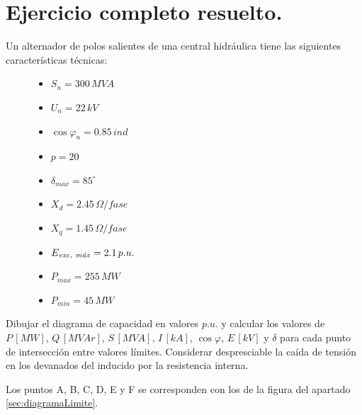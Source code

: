 		
	\section{Ejercicio completo resuelto.}		
		Un alternador de polos salientes de una central hidráulica tiene las siguientes características técnicas:
		\begin{figure}[H]
			\begin{minipage}{0.33\textwidth}
				\begin{itemize}
					\item $S_n = 300\,MV\!A$
					\item $U_n = 22\,kV$
					\item $\cos \varphi_n = 0.85\,ind$
					\item $p = 20$
				\end{itemize}
			\end{minipage}
			\begin{minipage}{0.33\textwidth}
				\begin{itemize}
					\item $\delta_{max} = 85^\circ$
					\item $X_d = 2.45\,\varOmega/fase$
					\item $X_q = 1.45\,\varOmega/fase$
				\end{itemize}
			\end{minipage}
			\begin{minipage}{0.33\textwidth}
				\begin{itemize}
					\item $E_{\text{\textit{exc, máx}}} = 2.1\,p.u.$
					\item $P_{max} = 255\,MW$
					\item $P_{min} = 45\,MW$
				\end{itemize}
			\end{minipage}
		\end{figure}
		

		Dibujar el diagrama de capacidad en valores $p.u.$ y calcular los valores de $P\,[MW]$, $Q\,[MV\!Ar]$, $S\,[MV\!A]$, $I\,[kA]$, $\cos \varphi$, $E\,[kV]$ y $\delta$ para cada punto de intersección entre valores límites. Considerar despresciable la caída de tensión en los devanados del inducido por la resistencia 
		interna.
		
		
		\noindent\makebox[\linewidth]{\rule{\paperwidth}{0.4pt}}
		\vspace{-0.2cm}
		
		Los puntos A, B, C, D, E y F se corresponden con los de la figura del apartado \ref{sec:diagramaLimite}.
		

